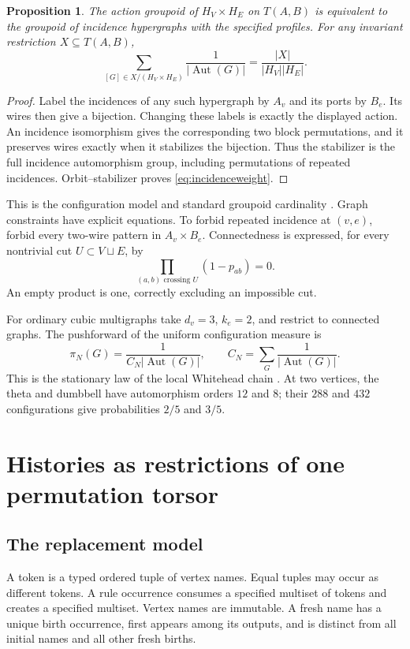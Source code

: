 \documentclass[11pt]{article}
\newtheorem{proposition}[theorem]{Proposition}
\theoremstyle{definition}
\newcommand{\Aut}{\operatorname{Aut}}
\numberwithin{equation}{section}
\begin{document}
\begin{proposition}\label{prop:incidence}
The action groupoid of $H_V\times H_E$ on $T(A,B)$ is equivalent
to the groupoid of incidence hypergraphs with the specified profiles.
For any invariant restriction $X\subseteq T(A,B)$,
\begin{equation}\label{eq:incidenceweight}
 \sum_{[G]\in X/(H_V\times H_E)}\frac1{|\Aut(G)|}
       =\frac{|X|}{|H_V||H_E|}.
\end{equation}
\end{proposition}
\begin{proof}
Label the incidences of any such hypergraph by $A_v$ and its ports by
$B_e$. Its wires then give a bijection. Changing these labels is
exactly the displayed action. An incidence isomorphism gives the
corresponding two block permutations, and it preserves wires exactly
when it stabilizes the bijection. Thus the stabilizer is the full
incidence automorphism group, including permutations of repeated
incidences. Orbit--stabilizer proves \eqref{eq:incidenceweight}.
\end{proof}

This is the configuration model and standard groupoid cardinality
\cite{BHW}. Graph constraints have explicit equations. To forbid
repeated incidence at $(v,e)$, forbid every two-wire pattern in
$A_v\times B_e$. Connectedness is expressed, for every nontrivial
cut $U\subset V\sqcup E$, by
\[
 \prod_{(a,b)\text{ crossing }U}(1-p_{ab})=0.
\]
An empty product is one, correctly excluding an impossible cut.

For ordinary cubic multigraphs take $d_v=3$, $k_e=2$, and restrict
to connected graphs. The pushforward of the uniform configuration
measure is
\[
 \pi_N(G)=\frac1{C_N|\Aut(G)|},\qquad
 C_N=\sum_G\frac1{|\Aut(G)|}.
\]
This is the stationary law of the local Whitehead chain
\cite{Whitehead}. At two vertices, the theta and dumbbell have
automorphism orders $12$ and $8$; their $288$ and $432$ configurations
give probabilities $2/5$ and $3/5$.

\section{Histories as restrictions of one permutation torsor}

\subsection{The replacement model}
A token is a typed ordered tuple of vertex names. Equal tuples may
occur as different tokens. A rule occurrence consumes a specified
multiset of tokens and creates a specified multiset. Vertex names
are immutable. A fresh name has a unique birth occurrence, first appears
among its outputs, and is distinct from all initial names and all other
fresh births.
\end{document}
